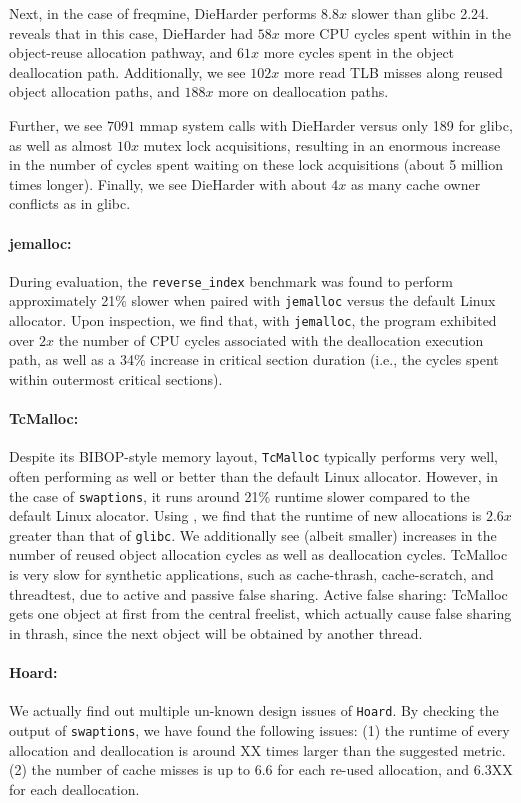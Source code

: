 Next, in the case of freqmine, DieHarder performs $8.8x$ slower than glibc 2.24. \MP{} reveals that in this case, DieHarder had $58x$ more CPU cycles spent within in the object-reuse allocation pathway, and $61x$ more cycles spent in the object deallocation path.
	Additionally, we see $102x$ more read TLB misses along reused object allocation paths, and $188x$ more on deallocation paths.
	
	Further, we see $7091$ mmap system calls with DieHarder versus only 189 for glibc, as well as almost $10x$ mutex lock acquisitions, resulting in an enormous increase in the number of cycles spent waiting on these lock acquisitions (about 5 million times longer).
	Finally, we see DieHarder with about $4x$ as many cache owner conflicts as in glibc.

\paragraph{jemalloc:}
During evaluation, the \texttt{reverse\_index} benchmark was found to perform approximately 21\% slower when paired with \texttt{jemalloc} versus the default Linux allocator. Upon inspection, we find that, with \texttt{jemalloc}, the program exhibited over $2x$ the number of CPU cycles associated with the deallocation execution path, as well as a 34\% increase in critical section duration (i.e., the cycles spent within outermost critical sections).

\paragraph{TcMalloc:}
Despite its BIBOP-style memory layout, \texttt{TcMalloc} typically performs very well, often performing as well or better than the default Linux allocator. However, in the case of \texttt{swaptions}, it runs around 21\% runtime slower compared to the default Linux alocator. Using \MP{}, we find that the runtime of new allocations  is $2.6x$ greater than that of \texttt{glibc}. We additionally see (albeit smaller) increases in the number of reused object allocation cycles as well as deallocation cycles.
TcMalloc is very slow for synthetic applications, such as cache-thrash, cache-scratch, and threadtest, due to active and passive false sharing. 
Active false sharing: TcMalloc gets one object at first from the central freelist, which actually cause false sharing in thrash, since the next object will be obtained by another thread. 



\paragraph{Hoard:} 
We actually find out multiple un-known design issues of \texttt{Hoard}. By checking the output of \texttt{swaptions}, we have found the following issues: (1) the runtime of every allocation and deallocation is around XX times larger than the suggested metric. (2) the number of cache misses  is up to 6.6 for each re-used allocation, and 6.3XX for each deallocation. 